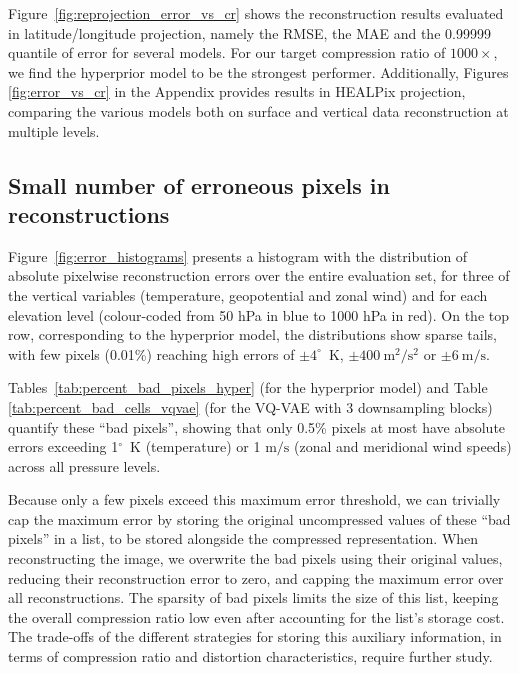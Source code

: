 \documentclass[11pt, a4paper, logo, copyright, numbering]{googledeepmind}
\begin{document}
Figure~\ref{fig:reprojection_error_vs_cr} shows the reconstruction results evaluated in latitude/longitude projection, namely the RMSE, the MAE and the 0.99999 quantile of error for several models. For our target compression ratio of $1000 \times$, we find the hyperprior model to be the strongest performer. Additionally, Figures \ref{fig:error_vs_cr} in the Appendix provides results in HEALPix projection, comparing the various models both on surface and vertical data reconstruction at multiple levels.   

\subsection{Small number of erroneous pixels in reconstructions}
\label{sx:experiments:bad-pixels}

Figure~\ref{fig:error_histograms} presents a histogram with the distribution of absolute pixelwise reconstruction errors over the entire evaluation set, for three of the vertical variables (temperature, geopotential and zonal wind) and for each elevation level (colour-coded from 50 hPa in blue to 1000 hPa in red). On the top row, corresponding to the hyperprior model, the distributions show sparse tails, with few pixels (0.01\%) reaching high errors of $\pm 4^\circ$~K, $\pm 400~\text{m}^2/\text{s}^2$ or $\pm 6~\text{m}/\text{s}$.

Tables~\ref{tab:percent_bad_pixels_hyper} (for the hyperprior model) and Table \ref{tab:percent_bad_cells_vqvae} (for the VQ-VAE with 3 downsampling blocks) quantify these ``bad pixels'', showing that only 0.5\% pixels at most have absolute errors exceeding 1$^\circ$~K (temperature) or 1 $\text{m}/\text{s}$ (zonal and meridional wind speeds) across all pressure levels.

Because only a few pixels exceed this maximum error threshold, we can trivially cap the maximum error by storing the original uncompressed values of these ``bad pixels'' in a list, to be stored alongside the compressed representation. When reconstructing the image, we overwrite the bad pixels using their original values, reducing their reconstruction error to zero, and capping the maximum error over all reconstructions. The sparsity of bad pixels limits the size of this list, keeping the overall compression ratio low even after accounting for the list's storage cost. The trade-offs of the different strategies for storing this auxiliary information, in terms of compression ratio and distortion characteristics, require further study.
\end{document}
